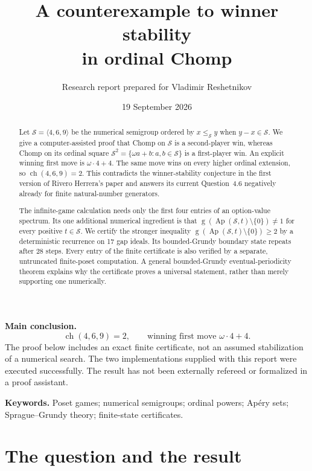 \documentclass[11pt,letterpaper]{article}
\title{\vspace{-1.2em}\color{Ink}\bfseries
 A counterexample to winner stability\\[3pt] in ordinal Chomp}
\author{Research report prepared for Vladimir Reshetnikov}
\date{19 September 2026}
\numberwithin{equation}{section}
\theoremstyle{definition}
\newcommand{\Sg}{\mathcal S}
\newcommand{\Gr}{\operatorname{g}}
\newcommand{\Ap}{\operatorname{Ap}}
\newcommand{\ch}{\operatorname{ch}}
\begin{document}
\maketitle
\thispagestyle{empty}
\begin{abstract}
Let $\Sg=\langle4,6,9\rangle$ be the numerical semigroup ordered by
$x\leq_{\Sg}y$ when $y-x\in\Sg$. We give a computer-assisted proof that
Chomp on $\Sg$ is a second-player win, whereas Chomp on its ordinal square
$\Sg^2=\{\omega a+b:a,b\in\Sg\}$ is a first-player win. An explicit winning
first move is $\omega\cdot4+4$. The same move wins on every higher ordinal
extension, so $\ch(4,6,9)=2$. This contradicts the winner-stability conjecture
in the first version of Rivero Herrera's paper and answers its current
Question~4.6 negatively already for finite natural-number generators.

The infinite-game calculation needs only the first four entries of an
option-value spectrum. Its one additional numerical ingredient is that
$\Gr(\Ap(\Sg,t)\setminus\{0\})\neq1$ for every positive $t\in\Sg$.
We certify the stronger inequality $\Gr(\Ap(\Sg,t)\setminus\{0\})\geq2$
by a deterministic recurrence on 17 gap ideals. Its bounded-Grundy boundary
state repeats after 28 steps. Every entry of the finite certificate is also
verified by a separate, untruncated finite-poset computation. A general
bounded-Grundy eventual-periodicity theorem explains why the certificate
proves a universal statement, rather than merely supporting one numerically.
\end{abstract}

\begin{resultbox}
\textbf{Main conclusion.}
\[
\boxed{\quad\ch(4,6,9)=2,\qquad
 \text{winning first move }\omega\cdot4+4.\quad}
\]
The proof below includes an exact finite certificate, not an assumed
stabilization of a numerical search. The two implementations supplied with
this report were executed successfully. The result has not been externally
refereed or formalized in a proof assistant.
\end{resultbox}

\vspace{3pt}
\noindent\textbf{Keywords.} Poset games; numerical semigroups; ordinal powers;
Ap\'ery sets; Sprague--Grundy theory; finite-state certificates.

\clearpage
\tableofcontents
\clearpage

\section{The question and the result}
\label{sec:question}
\end{document}
